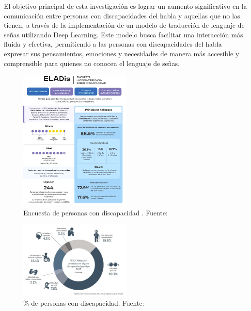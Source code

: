 El objetivo principal de esta investigación es lograr un aumento significativo en la comunicación entre personas con discapacidades del habla y aquellas que no las tienen, a través de la implementación de un modelo de traducción de lenguaje de señas utilizando Deep Learning. Este modelo busca facilitar una interacción más fluida y efectiva, permitiendo a las personas con discapacidades del habla expresar sus pensamientos, emociones y necesidades de manera más accesible y comprensible para quienes no conocen el lenguaje de señas.

\begin{figure}[h]
	\begin{center}
		\includegraphics[width=0.5\textwidth]{1/figures/Encuesta_personas_discapacidad.png}
		\caption{Encuesta de personas con discapacidad . Fuente: \cite{encuesta_personas_discapacidad}}
		\label{1:fig 2}
	\end{center}
\end{figure}

\begin{figure}[h]
	\begin{center}
		\includegraphics[width=0.5\textwidth]{1/figures/personas_discapacidad.jpg}
		\caption{\% de personas con discapacidad. Fuente: \cite{porcentaje de_personas_discapacidad}}
		\label{1:fig 1}
	\end{center}
\end{figure}




